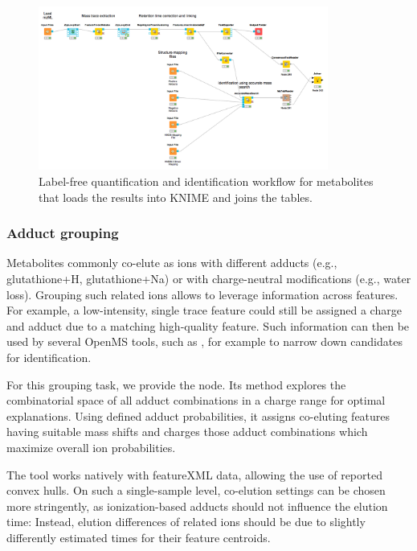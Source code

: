 \begin{figure}[htbp]
  \centering
  \includegraphics[width=0.85\textwidth]{graphics/metabo/metabo_part3.png}
  \caption{Label-free quantification and identification workflow for metabolites that loads the results into KNIME and joins the tables.}
  \label{fig:metabo_part3}
\end{figure}

\subsubsection{Adduct grouping}

Metabolites commonly co-elute as ions with different adducts (e.g., glutathione+H, glutathione+Na) or with charge-neutral modifications (e.g., water loss). Grouping such related ions allows to leverage information across features. For example, a low-intensity, single trace feature could still be assigned a charge and adduct due to a matching high-quality feature. Such information can then be used by several OpenMS tools, such as , for example to narrow down candidates for identification.

\noindent For this grouping task, we provide the  node. Its method explores the combinatorial space of all adduct combinations in a charge range for optimal explanations. Using defined adduct probabilities, it assigns co-eluting features having suitable mass shifts and charges those adduct combinations which maximize overall ion probabilities.

\noindent The tool works natively with featureXML data, allowing the use of reported convex hulls. On such a single-sample level, co-elution settings can be chosen more stringently, as ionization-based adducts should not influence the elution time: Instead, elution differences of related ions should be due to slightly differently estimated times for their feature centroids.

